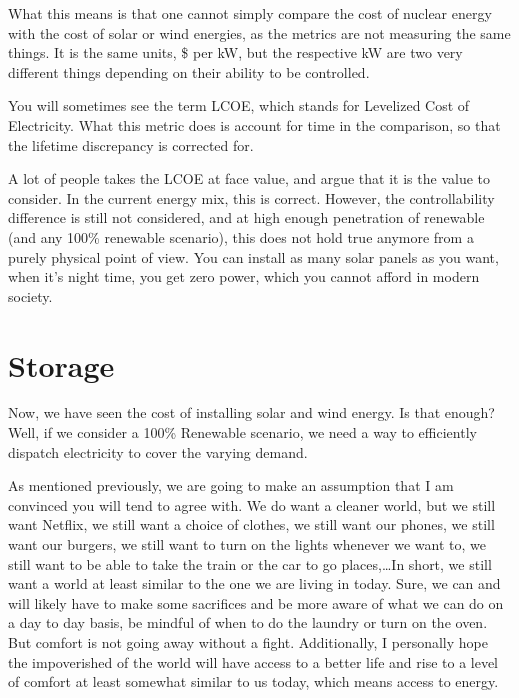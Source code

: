 
What this means is that one cannot simply compare the cost of nuclear energy with the cost of solar or wind energies, as the metrics are not measuring the same things. It is the same units, \$ per kW, but the respective kW are two very different things depending on their ability to be controlled.



\begin{kaobox}[frametitle=Levelized Cost Of Electricity]
You will sometimes see the term LCOE, which stands for Levelized Cost of Electricity. What this metric does is account for time in the comparison, so that the lifetime discrepancy is corrected for.

A lot of people takes the LCOE at face value, and argue that it is the value to consider. In the current energy mix, this is correct. However, the controllability difference is still not considered, and at high enough penetration of renewable (and any 100\% renewable scenario), this does not hold true anymore from a purely physical point of view. You can install as many solar panels as you want, when it's night time, you get zero power, which you cannot afford in modern society.
\end{kaobox}


\section{Storage}

Now, we have seen the cost of installing solar and wind energy. Is that enough? Well, if we consider a 100\% Renewable scenario, we need a way to efficiently dispatch electricity to cover the varying demand.


As mentioned previously, we are going to make an assumption that I am convinced you will tend to agree with. We do want a cleaner world, but we still want Netflix, we still want a choice of clothes, we still want our phones, we still want our burgers, we still want to turn on the lights whenever we want to, we still want to be able to take the train or the car to go places,\ldots In short, we still want a world at least similar to the one we are living in today. Sure, we can and will likely have to make some sacrifices and be more aware of what we can do on a day to day basis, be mindful of when to do the laundry or turn on the oven. But comfort is not going away without a fight. Additionally, I personally hope the impoverished of the world will have access to a better life and rise to a level of comfort at least somewhat similar to us today, which means access to energy.

